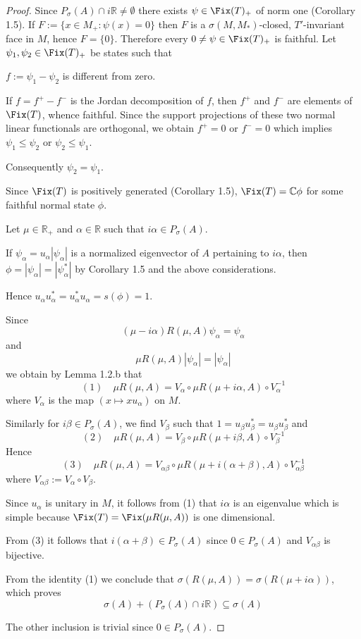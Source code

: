 \begin{proof}
Since $P_{\sigma}(A) \cap i\mathbb{R} \neq \emptyset$ there exists $\psi \in \Fix(T)_{+}$ of norm one (Corollary 1.5).
If $F := \{x \in M_{+} : \psi(x) = 0\}$ then $F$ is a $\sigma(M,M_{*})$-closed, $T'$-invariant face in $M$, hence $F = \{0\}$.
Therefore every $0 \neq \psi \in \Fix(T)_{+}$ is faithful.
Let $\psi_{1}, \psi_{2} \in \Fix(T)_{+}$ be states such that


$f := \psi_{1} - \psi_{2}$ is different from zero.

If $f = f^{+} - f^{-}$ is the Jordan decomposition of $f$, then $f^{+}$ and $f^{-}$ are elements of $\Fix(T)$, whence faithful.
Since the support projections of these two normal linear functionals are orthogonal, we obtain $f^{+} = 0$ or $f^{-} = 0$ which implies $\psi_{1} \leq \psi_{2}$ or $\psi_{2} \leq \psi_{1}$.

Consequently $\psi_{2} = \psi_{1}$.

Since $\Fix(T)$ is positively generated (Corollary 1.5), $\Fix(T) = \mathbb{C}\phi$ for some faithful normal state $\phi$.

Let $\mu \in \mathbb{R}_{+}$ and $\alpha \in \mathbb{R}$ such that $i\alpha \in P_{\sigma}(A)$.

If $\psi_{\alpha} = u_{\alpha}|\psi_{\alpha}|$ is a normalized eigenvector of $A$ pertaining to $i\alpha$, then $\phi = |\psi_{\alpha}| = |\psi_{\alpha}^{*}|$ by Corollary 1.5 and the above considerations.

Hence $u_{\alpha}u_{\alpha}^{*} = u_{\alpha}^{*}u_{\alpha} = s(\phi) = 1$.

Since
\[
(\mu - i\alpha)R(\mu,A)\psi_{\alpha} = \psi_{\alpha}
\]
and
\[
\mu R(\mu,A)|\psi_{\alpha}| = |\psi_{\alpha}|
\]
we obtain by Lemma 1.2.b that
\[
(1) \quad \mu R(\mu,A) = V_{\alpha} \circ \mu R(\mu+i\alpha,A) \circ V_{\alpha}^{-1}
\]
where $V_{\alpha}$ is the map $(x \mapsto xu_{\alpha})$ on $M$.

Similarly for $i\beta \in P_{\sigma}(A)$, we find $V_{\beta}$ such that $1 = u_{\beta}u_{\beta}^{*} = u_{\beta}u_{\beta}^{*}$ and
\[
(2) \quad \mu R(\mu,A) = V_{\beta} \circ \mu R(\mu+i\beta,A) \circ V_{\beta}^{-1}
\]
Hence
\[
(3) \quad \mu R(\mu,A) = V_{\alpha\beta} \circ \mu R(\mu+i(\alpha+\beta),A) \circ V_{\alpha\beta}^{-1}
\]
where $V_{\alpha\beta} := V_{\alpha} \circ V_{\beta}$.

Since $u_{\alpha}$ is unitary in $M$, it follows from (1) that $i\alpha$ is an eigenvalue which is simple because $\Fix(T) = \Fix(\mu R(\mu,A))$ is one dimensional.

From (3) it follows that $i(\alpha+\beta) \in P_{\sigma}(A)$ since $0 \in P_{\sigma}(A)$ and $V_{\alpha\beta}$ is bijective.

From the identity (1) we conclude that $\sigma(R(\mu,A)) = \sigma(R(\mu+i\alpha))$, which proves
\[
\sigma(A) + (P_{\sigma}(A) \cap i\mathbb{R}) \subseteq \sigma(A)
\]

The other inclusion is trivial since $0 \in P_{\sigma}(A)$.
\end{proof}

